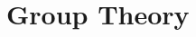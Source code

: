 \documentclass{mathbook}
\date{\today}
\begin{document}
\makecover
\frontmatter
\tableofcontents

\mainmatter

\part{Group Theory}

\end{document}
